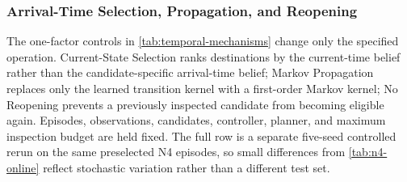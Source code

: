 \subsubsection{Arrival-Time Selection, Propagation, and Reopening}
\label{app:mechanism-controls}

The one-factor controls in \cref{tab:temporal-mechanisms} change only the
specified operation. Current-State Selection ranks destinations by the
current-time belief rather than the candidate-specific arrival-time belief;
Markov Propagation replaces only the learned transition kernel with a
first-order Markov kernel; No Reopening prevents a previously inspected
candidate from becoming eligible again. Episodes, observations, candidates,
controller, planner, and maximum inspection budget are held fixed. The full
row is a separate five-seed controlled rerun on the same preselected N4
episodes, so small differences from \cref{tab:n4-online} reflect stochastic
variation rather than a different test set.

\begin{table}[!t]
\caption{One-factor temporal ablation on the preselected N4 dynamic episodes.
SR and Revisit Success are percentages; SPL is unscaled. Values are mean
$\pm$ sample standard deviation over five independent seeds.}
\label{tab:temporal-mechanisms}
\centering
\scriptsize
\setlength{\tabcolsep}{4pt}
\end{table}

